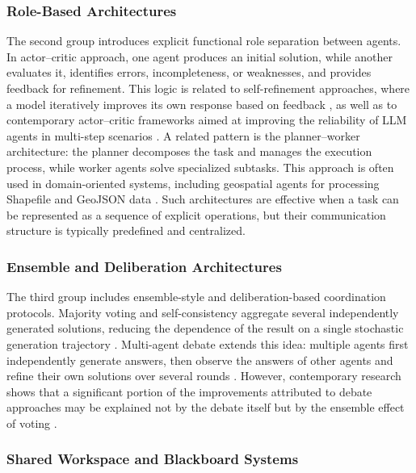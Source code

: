 \subsubsection{Role-Based Architectures}

The second group introduces explicit functional role separation between agents.
In actor–critic approach, one agent produces an initial solution, while another evaluates it, identifies errors, incompleteness, or weaknesses, and provides feedback for refinement.
This logic is related to self-refinement approaches, where a model iteratively improves its own response based on feedback \cite{madaan2023selfrefine}, as well as to contemporary actor–critic frameworks aimed at improving the reliability of LLM agents in multi-step scenarios \cite{jiang2026asymmetric}.
A related pattern is the planner–worker architecture: the planner decomposes the task and manages the execution process, while worker agents solve specialized subtasks.
This approach is often used in domain-oriented systems, including geospatial agents for processing Shapefile and GeoJSON data \cite{lin2025shapefilegpt,luo2026geojson}.
Such architectures are effective when a task can be represented as a sequence of explicit operations, but their communication structure is typically predefined and centralized.

\subsubsection{Ensemble and Deliberation Architectures}

The third group includes ensemble-style and deliberation-based coordination protocols.
Majority voting and self-consistency aggregate several independently generated solutions, reducing the dependence of the result on a single stochastic generation trajectory \cite{wang2023selfconsistency}.
Multi-agent debate extends this idea: multiple agents first independently generate answers, then observe the answers of other agents and refine their own solutions over several rounds \cite{du2023improving}.
However, contemporary research shows that a significant portion of the improvements attributed to debate approaches may be explained not by the debate itself but by the ensemble effect of voting \cite{choi2025debate}. 

\subsubsection{Shared Workspace and Blackboard Systems}

